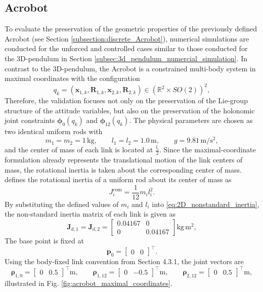 \subsection{Acrobot}
\label{subsec:evaluation_acrobot}

To evaluate the preservation of the geometric properties of the previously defined Acrobot (see Section \ref{subsection:discrete_Acrobot}), 
numerical simulations are conducted for the unforced and controlled cases similar to those conducted for the 3D-pendulum 
in Section \ref{subsec:3d_pendulum_numercial_simulation}. 
In contrast to the 3D-pendulum, the Acrobot is a constrained multi-body system in maximal coordinates with the configuration 
\[
q_k =
\left(
\bm{x}_{1,k},
\bm{R}_{1,k},
\bm{x}_{2,k},
\bm{R}_{2,k}
\right)
\in
\left(\mathbb{R}^{2}\times SO(2)\right)^2 ,
\]
Therefore, the validation focuses not only on the preservation of the Lie-group structure of the attitude variables, but also on the preservation of the holonomic joint constraints $\bm{\phi}_0(q_k)$ and $\bm{\phi}_{12}(q_k)$. 
The physical parameters are chosen as two identical uniform rods with
\[
    m_1=m_2=1\,\mathrm{kg},
    \qquad
    l_1=l_2=1.0\,\mathrm{m},
    \qquad
    g=9.81\,\mathrm{m/s^2},
\]
and the center of mass of each link is located at $\frac{l_i}{2}$.
Since the maximal-coordinate formulation already represents the translational
motion of the link centers of mass, the rotational inertia is taken about the
corresponding center of mass. \cite{Benacquista2018ClassicalMechanics} defines
the rotational inertia of a uniform rod about its center of mass as
\[
    J_i^{\mathrm{com}}
    =
    \frac{1}{12}m_i l_i^2.
\]
By substituting the defined values of $m_i$ and $l_i$ into \eqref{eq:2D_nonstandard_inertia},
the non-standard inertia matrix of each link is given as
\[
    \bm{J}_{d,1}
    =
    \bm{J}_{d,2}
    =
    \begin{bmatrix}
        0.04167 & 0\\
        0 & 0.04167
    \end{bmatrix}
    \mathrm{kg\,m^2},
\]
The base point is fixed at
\[
    \bm{p}_0 =
    \begin{bmatrix}
        0 & 0
    \end{bmatrix}^{\top}.
\]
Using the body-fixed link convention from Section 4.3.1, the joint vectors are
\[
\bm{\rho}_{1,0}
=
\begin{bmatrix}
0 & 0.5
\end{bmatrix}^{\top}\mathrm{m},
\qquad
\bm{\rho}_{1,12}
=
\begin{bmatrix}
0 & -0.5
\end{bmatrix}^{\top}\mathrm{m},
\qquad
\bm{\rho}_{2,12}
=
\begin{bmatrix}
0 & 0.5
\end{bmatrix}^{\top}\mathrm{m},
\]
illustrated in Fig. \ref{fig:acrobot_maximal_coordinates}.

